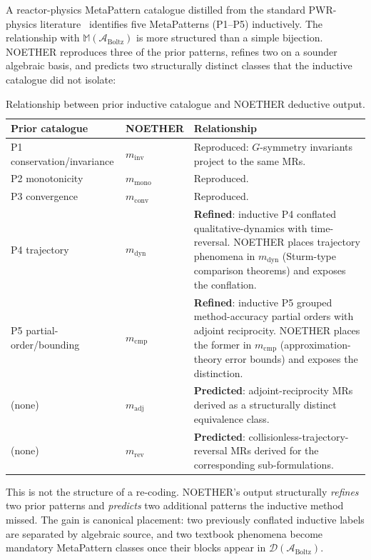 \documentclass[manuscript]{acmart}
\begin{document}
A reactor-physics MetaPattern catalogue distilled from the standard PWR-physics literature~\cite{BellGlasstone1970, LewisMiller1993} identifies five MetaPatterns (P1--P5) inductively. The relationship with $\mathbb{M}(\mathcal{A}_{\mathrm{Boltz}})$ is more structured than a simple bijection. NOETHER reproduces three of the prior patterns, refines two on a sounder algebraic basis, and predicts two structurally distinct classes that the inductive catalogue did not isolate:

\begin{table}[h]
\centering
\caption{Relationship between prior inductive catalogue and NOETHER deductive output.}
\label{tab:refinement}
\small
\begin{tabular}{p{} p{} p{}}
\toprule
\textbf{Prior catalogue} & \textbf{NOETHER} & \textbf{Relationship} \\
\midrule
P1 conservation/invariance & $m_{\mathrm{inv}}$ & Reproduced: $G$-symmetry invariants project to the same MRs. \\
P2 monotonicity & $m_{\mathrm{mono}}$ & Reproduced. \\
P3 convergence & $m_{\mathrm{conv}}$ & Reproduced. \\
P4 trajectory & $m_{\mathrm{dyn}}$ & \textbf{Refined}: inductive P4 conflated qualitative-dynamics with time-reversal. NOETHER places trajectory phenomena in $m_{\mathrm{dyn}}$ (Sturm-type comparison theorems) and exposes the conflation. \\
P5 partial-order/bounding & $m_{\mathrm{cmp}}$ & \textbf{Refined}: inductive P5 grouped method-accuracy partial orders with adjoint reciprocity. NOETHER places the former in $m_{\mathrm{cmp}}$ (approximation-theory error bounds) and exposes the distinction. \\
(none) & $m_{\mathrm{adj}}$ & \textbf{Predicted}: adjoint-reciprocity MRs derived as a structurally distinct equivalence class. \\
(none) & $m_{\mathrm{rev}}$ & \textbf{Predicted}: collisionless-trajectory-reversal MRs derived for the corresponding sub-formulations. \\
\bottomrule
\end{tabular}
\end{table}

This is not the structure of a re-coding. NOETHER's output structurally \emph{refines} two prior patterns and \emph{predicts} two additional patterns the inductive method missed. The gain is canonical placement: two previously conflated inductive labels are separated by algebraic source, and two textbook phenomena become mandatory MetaPattern classes once their blocks appear in $\mathcal{D}(\mathcal{A}_{\mathrm{Boltz}})$.
\end{document}

